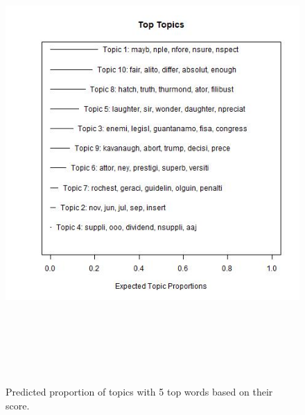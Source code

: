 \documentclass [12pt]{article}
\begin{document}
\begin{figure}[H]
    \centering
    \includegraphics[height = 175mm, width = 175mm]{../tables_figures/stm_poc_frex.jpg}
    \caption{Predicted proportion of topics with 5 top words based on their score.}
    \label{fig:frex_poc}
\end{figure}
\end{document}

